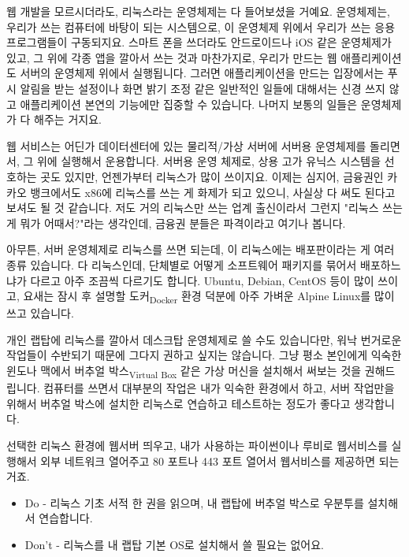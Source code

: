 \documentclass[11pt,a4paper]{article}
\newcommand{\sub}[1]{\textsubscript{#1}}
\begin{document}
웹 개발을 모르시더라도, \textsf{리눅스}라는 운영체제는 다 들어보셨을 거예요. 운영체제는, 우리가 쓰는 컴퓨터에 바탕이 되는 시스템으로, 이 운영체제 위에서 우리가 쓰는 응용 프로그램들이 구동되지요. 스마트 폰을 쓰더라도 안드로이드나 iOS 같은 운영체제가 있고, 그 위에 각종 앱을 깔아서 쓰는 것과 마찬가지로, 우리가 만드는 웹 애플리케이션도 서버의 운영체제 위에서 실행됩니다. 그러면 애플리케이션을 만드는 입장에서는 푸시 알림을 받는 설정이나 화면 밝기 조정 같은 일반적인 일들에 대해서는 신경 쓰지 않고 애플리케이션 본연의 기능에만 집중할 수 있습니다. 나머지 보통의 일들은 운영체제가 다 해주는 거지요.

웹 서비스는 어딘가 데이터센터에 있는 물리적/가상 서버에 서버용 운영체제를 돌리면서, 그 위에 실행해서 운용합니다. 서버용 운영 체제로, 상용 고가 유닉스 시스템을 선호하는 곳도 있지만, 언젠가부터 리눅스가 많이 쓰이지요. 이제는 심지어, 금융권인 카카오 뱅크에서도 x86에 리눅스를 쓰는 게 화제가 되고 있으니, 사실상 다 써도 된다고 보셔도 될 것 같습니다. 저도 거의 리눅스만 쓰는 업계 출신이라서 그런지 "리눅스 쓰는 게 뭐가 어때서?"라는 생각인데, 금융권 분들은 파격이라고 여기나 봅니다.

아무튼, 서버 운영체제로 리눅스를 쓰면 되는데, 이 리눅스에는 배포판이라는 게 여러 종류 있습니다. 다 리눅스인데, 단체별로 어떻게 소프트웨어 패키지를 묶어서 배포하느냐가 다르고 아주 조끔씩 다르기도 합니다. Ubuntu, Debian, CentOS 등이 많이 쓰이고, 요새는 잠시 후 설명할 도커\sub{Docker} 환경 덕분에 아주 가벼운 Alpine Linux를 많이 쓰고 있습니다.

개인 랩탑에 리눅스를 깔아서 데스크탑 운영체제로 쓸 수도 있습니다만, 워낙 번거로운 작업들이 수반되기 때문에 그다지 권하고 싶지는 않습니다. 그냥 평소 본인에게 익숙한 윈도나 맥에서 버추얼 박스\sub{Virtual Box} 같은 가상 머신을 설치해서 써보는 것을 권해드립니다. 컴퓨터를 쓰면서 대부분의 작업은 내가 익숙한 환경에서 하고, 서버 작업만을 위해서 버추얼 박스에 설치한 리눅스로 연습하고 테스트하는 정도가 좋다고 생각합니다.

선택한 리눅스 환경에 웹서버 띄우고, 내가 사용하는 파이썬이나 루비로 웹서비스를 실행해서 외부 네트워크 열어주고 80 포트나 443 포트 열어서 웹서비스를 제공하면 되는 거죠.

\begin{itemize}
\item{Do} - 리눅스 기초 서적 한 권을 읽으며, 내 랩탑에 버추얼 박스로 우분투를 설치해서 연습합니다.
\item{Don't} - 리눅스를 내 랩탑 기본 OS로 설치해서 쓸 필요는 없어요.
\end{itemize}
\end{document}
